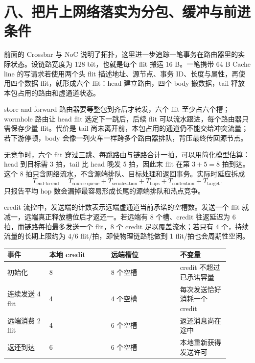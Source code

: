 \section{八、把片上网络落实为分包、缓冲与前进条件}

前面的 Crossbar 与 NoC 说明了拓扑，这里进一步追踪一笔事务在路由器里的实际状态。设链路宽度为 128 bit，也就是每个 flit 搬运 16 B。一笔携带 64 B Cache line 的写请求若使用两个头 flit 描述地址、源节点、事务 ID、长度与属性，再使用四个数据 flit，就形成六个 flit：head 建立路由，四个 body 搬数据，tail 释放本包占用的路由和虚通道状态。


store-and-forward 路由器要等整包到齐后才转发，六个 flit 至少占六个槽；wormhole 路由让 head flit 选定下一跳后，后续 flit 可以流水跟进，每个路由器只需保存少量 flit。代价是 tail 尚未离开前，本包占用的通道仍不能交给冲突流量；若下游停顿，body 会像一列火车一样跨多个路由器排队，背压最终传回源节点。

无竞争时，六个 flit 穿过三跳、每跳路由与链路合计一拍，可以用简化模型估算：head 到目标需 3 拍，tail 比 head 晚发 5 拍，因此末 flit 在第 $3+5=8$ 拍到达。这个 8 拍只含网络流水，不含源端排队、目标处理和返回事务。实际时延应拆成
\[
T_{\text{end-to-end}}
=T_{\text{source queue}}+T_{\text{serialization}}
+T_{\text{hops}}+T_{\text{contention}}+T_{\text{target}} .
\]
只报告平均 hop 数会漏掉最容易形成长尾的源端排队和热点竞争。


credit 流控中，发送端的计数表示远端虚通道当前承诺的空槽数。发送一个 flit 就减一，远端真正释放槽位后才返还一。若远端有 8 个槽、credit 往返延迟为 6 拍，而链路每拍最多发送一个 flit，8 个 credit 足以覆盖流水；若只有 4 个，持续流量的长期上限约为 $4/6$ flit/拍，即使物理链路能做到 1 flit/拍也会周期性空闲。

\begin{longtable}{L{0.17\linewidth}L{0.25\linewidth}L{0.28\linewidth}L{0.20\linewidth}}
\toprule
事件 & 本地 credit & 远端槽位 & 不变量 \\
\midrule
初始化 & 8 & 8 个空槽 & credit 不超过已承诺容量 \\\tablerowrule
连续发送 4 flit & 4 & 4 个空槽 & 每次发送恰好消耗一个 credit \\\tablerowrule
远端消费 2 flit & 4 & 6 个空槽 & 返还消息尚在途中 \\\tablerowrule
返还到达 & 6 & 6 个空槽 & 本地重新获得发送许可 \\
\bottomrule
\end{longtable}

